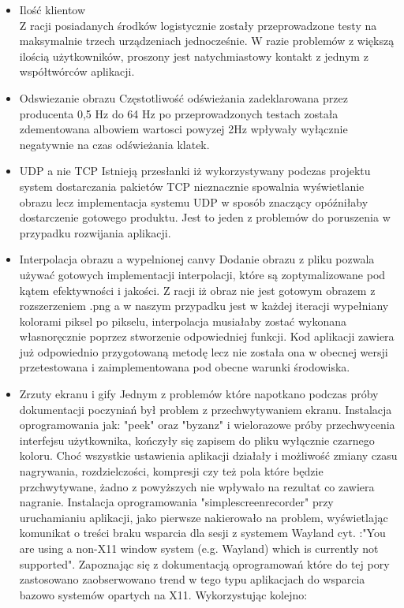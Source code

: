 \documentclass[a4paper,twoside,12pt]{book}
\begin{document}
\begin{itemize}
\item Ilość klientow
\\Z racji posiadanych środków logistycznie zostały przeprowadzone testy na maksymalnie trzech urządzeniach jednocześnie. W razie problemów z większą ilością użytkowników, proszony jest natychmiastowy kontakt z jednym z współtwórców aplikacji.
\item Odswiezanie obrazu
 Częstotliwość odświeżania zadeklarowana przez producenta 0,5 Hz do 64 Hz po przeprowadzonych testach została zdementowana albowiem wartosci powyzej 2Hz wpływały wyłącznie negatywnie na czas odświeżania klatek.
\item UDP a nie TCP
Istnieją przesłanki iż wykorzystywany podczas projektu system dostarczania pakietów TCP nieznacznie spowalnia wyświetlanie obrazu lecz implementacja systemu UDP w sposób znaczący opóźniłaby dostarczenie gotowego produktu. Jest to jeden z problemów do poruszenia w przypadku rozwijania aplikacji.
\item Interpolacja obrazu a wypelnionej canvy
Dodanie obrazu z pliku pozwala używać gotowych implementacji interpolacji, które są zoptymalizowane pod kątem efektywności i jakości. Z racji iż obraz nie jest gotowym obrazem z rozszerzeniem .png a w naszym przypadku jest w każdej iteracji wypełniany kolorami piksel po pikselu, interpolacja musiałaby zostać wykonana własnoręcznie poprzez stworzenie odpowiedniej funkcji. Kod aplikacji zawiera już odpowiednio przygotowaną metodę lecz nie została ona w obecnej wersji przetestowana i zaimplementowana pod obecne warunki środowiska.
\item Zrzuty ekranu i gify
Jednym z problemów które napotkano podczas próby dokumentacji poczyniań był problem z przechwytywaniem ekranu. Instalacja oprogramowania jak: "peek" oraz "byzanz" i wielorazowe próby przechwycenia interfejsu użytkownika, kończyły się zapisem do pliku wyłącznie czarnego koloru. Choć wszystkie ustawienia aplikacji działały i możliwość zmiany czasu nagrywania, rozdzielczości, kompresji czy też pola które będzie przchwytywane, żadno z powyższych nie wpływało na rezultat co zawiera nagranie. Instalacja oprogramowania "simplescreenrecorder" przy uruchamianiu aplikacji, jako pierwsze nakierowało na problem, wyświetlając komunikat o treści braku wsparcia dla sesji z systemem Wayland cyt. :"You are using a non-X11 window system (e.g. Wayland) which is currently not supported". Zapoznając się z dokumentacją oprogramowań które do tej pory zastosowano zaobserwowano trend w tego typu aplikacjach do wsparcia bazowo systemów opartych na X11. Wykorzystując kolejno:

\end{itemize}
\end{document}

